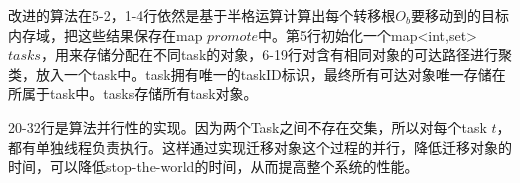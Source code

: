 

改进的算法在5-2，1-4行依然是基于半格运算计算出每个转移根$O_b$要移动到的目标内存域，把这些结果保存在map $promote$中。第5行初始化一个map<int,set> $tasks$，用来存储分配在不同task的对象，6-19行对含有相同对象的可达路径进行聚类，放入一个task中。task拥有唯一的taskID标识，最终所有可达对象唯一存储在所属于task中。tasks存储所有task对象。

20-32行是算法并行性的实现。因为两个Task之间不存在交集，所以对每个task $t$，都有单独线程负责执行。这样通过实现迁移对象这个过程的并行，降低迁移对象的时间，可以降低stop-the-world的时间，从而提高整个系统的性能。



